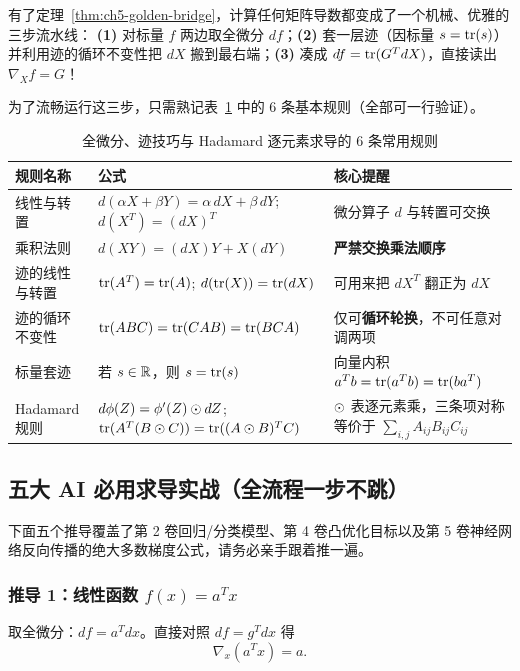 有了定理~\ref{thm:ch5-golden-bridge}，计算任何矩阵导数都变成了一个机械、优雅的三步流水线：
\textbf{(1)} 对标量 $f$ 两边取全微分 $df$；\textbf{(2)} 套一层迹（因标量 $s = \operatorname{tr}(s)$）并利用迹的循环不变性把 $dX$ 搬到最右端；\textbf{(3)} 凑成 $df = \operatorname{tr}(G^T dX)$，直接读出 $\nabla_X f = G$！

为了流畅运行这三步，只需熟记表~\ref{tab:ch5-trace-rules} 中的 6 条基本规则（全部可一行验证）。

\begin{table}[htbp]
\centering
\caption{全微分、迹技巧与 Hadamard 逐元素求导的 6 条常用规则}
\label{tab:ch5-trace-rules}
\small
\begin{tabularx}{\linewidth}{@{}p{26mm}p{58mm}X@{}}
\toprule
\textbf{规则名称} & \textbf{公式} & \textbf{核心提醒} \\
\midrule
线性与转置 & $d(\alpha X+\beta Y)=\alpha\,dX+\beta\,dY$;\; $d(X^T)=(dX)^T$ & 微分算子 $d$ 与转置可交换 \\
乘积法则 & $d(XY) = (dX)Y + X(dY)$ & \textbf{严禁交换乘法顺序} \\
迹的线性与转置 & $\operatorname{tr}(A^T)=\operatorname{tr}(A)$;\; $d(\operatorname{tr}(X))=\operatorname{tr}(dX)$ & 可用来把 $dX^T$ 翻正为 $dX$ \\
迹的循环不变性 & $\operatorname{tr}(ABC) = \operatorname{tr}(CAB) = \operatorname{tr}(BCA)$ & 仅可\textbf{循环轮换}，不可任意对调两项 \\
标量套迹 & 若 $s\in\mathbb{R}$，则 $s = \operatorname{tr}(s)$ & 向量内积 $a^T b = \operatorname{tr}(a^T b) = \operatorname{tr}(b a^T)$ \\
Hadamard 规则 & $d\phi(Z) = \phi'(Z)\odot dZ$;\; $\operatorname{tr}(A^T(B\odot C)) = \operatorname{tr}((A\odot B)^T C)$ & $\odot$ 表逐元素乘，三条项对称等价于 $\sum_{i,j}A_{ij}B_{ij}C_{ij}$ \\
\bottomrule
\end{tabularx}
\end{table}

\subsection{五大 AI 必用求导实战（全流程一步不跳）}

下面五个推导覆盖了第 2 卷回归/分类模型、第 4 卷凸优化目标以及第 5 卷神经网络反向传播的绝大多数梯度公式，请务必亲手跟着推一遍。

\subsubsection{推导 1：线性函数 $f(x) = a^T x$}
取全微分：$df = a^T dx$。直接对照 $df = g^T dx$ 得
\begin{equation}\label{eq:ch5-grad-linear}
  \nabla_x (a^T x) = a.
\end{equation}

